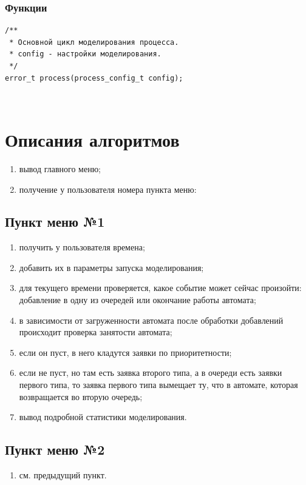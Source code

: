 \documentclass[a4paper,12pt]{extarticle}
\begin{document}
\subsubsection{Функции}
\begin{verbatim}
/**
 * Основной цикл моделирования процесса.
 * config - настройки моделирования.
 */
error_t process(process_config_t config);
\end{verbatim}
\begin{verbatim}
	
\end{verbatim}




\newpage
\section{Описания алгоритмов}


\begin{enumerate}
    \item вывод главного меню;
    \item получение у пользователя номера пункта меню:
\end{enumerate}

\subsection{Пункт меню №1}
\begin{enumerate}
    \item получить у пользователя времена;
    \item добавить их в параметры запуска моделирования;
    \item для текущего времени проверяется, какое событие может сейчас произойти: добавление в одну из очередей или окончание работы автомата;
    \item в зависимости от загруженности автомата после обработки добавлений происходит проверка занятости автомата;
    \item если он пуст, в него кладутся заявки по приоритетности;
    \item если не пуст, но там есть заявка второго типа, а в очереди есть заявки первого типа, то заявка первого типа вымещает ту, что в автомате, которая возвращается во вторую очередь;
    \item вывод подробной статистики моделирования.
\end{enumerate}

\subsection{Пункт меню №2}
\begin{enumerate}
    \item см. предыдущий пункт.
\end{enumerate}
\end{document}
